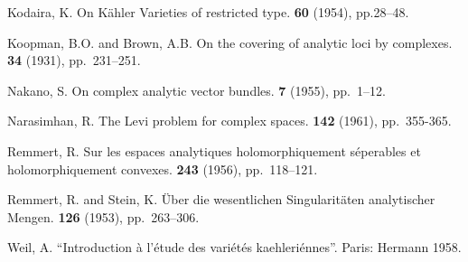 \documentclass{article}
\theoremstyle{plain}
\theoremstyle{definition}
\begin{document}
\begin{thebibliography}{20}
  {\sc Kodaira, K.}
  \newblock On K\"{a}hler Varieties of restricted type.
   {\bf 60} (1954), pp.28--48.

  {\sc Koopman, B.O. and Brown, A.B.}
  \newblock On the covering of analytic loci by complexes.
   {\bf 34} (1931), pp.~231--251.

  {\sc Nakano, S.}
  \newblock On complex analytic vector bundles.
   {\bf 7} (1955), pp.~1--12.

  {\sc Narasimhan, R.}
  \newblock The Levi problem for complex spaces.
   {\bf 142} (1961), pp.~355-365.

  {\sc Remmert, R.}
  \newblock Sur les espaces analytiques holomorphiquement s\'{e}perables et holomorphiquement convexes.
   {\bf 243} (1956), pp.~118--121.

  {\sc Remmert, R. and Stein, K.}
  \newblock \"{U}ber die wesentlichen Singularit\"{a}ten analytischer Mengen.
   {\bf 126} (1953), pp.~263--306.

  {\sc Weil, A.}
  \newblock ``Introduction \`{a} l'\'{e}tude des vari\'{e}t\'{e}s kaehleri\'{e}nnes''.
  \newblock Paris: Hermann 1958.

\end{thebibliography}
\end{document}
